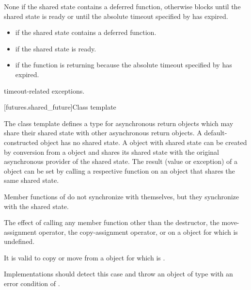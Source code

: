 \begin{itemdescr}
\pnum
\effects
None if the shared state contains a deferred function,
otherwise
blocks until the shared state is ready or until
the absolute timeout specified by  has expired.

\pnum
\returns

\begin{itemize}
\item {} if the shared state contains a deferred
function.

\item {} if the shared state is ready.

\item {} if the function is returning because the
absolute timeout
specified by  has expired.
\end{itemize}

\pnum
\throws
timeout-related exceptions.
\end{itemdescr}


[futures.shared_future]{Class template }

\pnum
The class template  defines a type for asynchronous return objects
which may share their shared state with other asynchronous return
objects. A default-constructed 
object has no shared state. A  object with
shared state can
be created
by conversion from a  object and shares its shared state with the
original asynchronous provider of the shared state.
The result (value or exception) of a  object
can be set by
calling a respective function on an
object that shares the same shared state.

\pnum
\begin{note} Member functions of  do not synchronize with themselves,
but they synchronize with the shared state. \end{note}

\pnum
The effect of calling any member function other than the destructor,
the move-assignment operator, the copy-assignment operator, or
 on a  object for which  is undefined.
\begin{note} It is valid to copy or move from a 
object for which  is . \end{note}
\begin{note} Implementations should detect this case and throw an object of type
 with an error condition of . \end{note}

